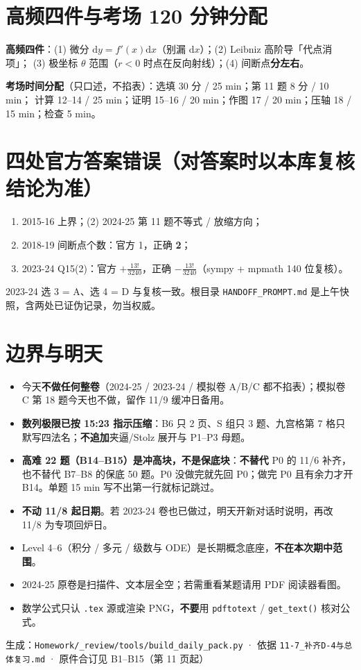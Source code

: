 \documentclass[10pt,a4paper]{ctexart}
\newcommand{\D}{\mathrm{d}}
\begin{document}
\clearpage

\section*{高频四件与考场 120 分钟分配}
\textbf{高频四件}：(1) 微分 $\D y=f'(x)\D x$（别漏 $\D x$）；(2) Leibniz 高阶导「代点消项」；
(3) 极坐标 $\theta$ 范围（$r<0$ 时点在反向射线）；(4) 间断点\textbf{分左右}。

\textbf{考场时间分配}（只口述，不掐表）：选填 30 分 / 25 min；第 11 题 8 分 / 10 min；
计算 12--14 / 25 min；证明 15--16 / 20 min；作图 17 / 20 min；压轴 18 / 15 min；检查 5 min。

\section*{四处官方答案错误（对答案时以本库复核结论为准）}
\begin{enumerate}
\item 2015-16 上界；\quad (2) 2024-25 第 11 题不等式 / 放缩方向；
\item 2018-19 间断点个数：官方 1，正确 \textbf{2}；
\item 2023-24 Q15(2)：官方 $+\frac{13!}{3240}$，正确 \textbf{$-\frac{13!}{3240}$}（sympy + mpmath 140 位复核）。
\end{enumerate}
2023-24 选 3 = A、选 4 = D 与复核一致。根目录 \texttt{HANDOFF\_PROMPT.md} 是上午快照，含两处已证伪记录，勿当权威。

\section*{边界与明天}
\begin{itemize}
\item 今天\textbf{不做任何整卷}（2024-25 / 2023-24 / 模拟卷 A/B/C 都不掐表）；模拟卷 C 第 18 题今天也不做，留作 11/9 缓冲日备用。
\item \textbf{数列极限已按 15:23 指示压缩}：B6 只 2 页、S 组只 3 题、九宫格第 7 格只默写四法名；\textbf{不追加}夹逼/Stolz 展开与 P1--P3 母题。
\item \textbf{高难 22 题（B14--B15）是冲高块，不是保底块}：\textbf{不替代} P0 的 11/6 补齐，也不替代 B7--B8 的保底 50 题。P0 没做完就先回 P0；做完 P0 且有余力才开 B14。单题 15 min 写不出第一行就标记跳过。
\item \textbf{不动 11/8 起日期}。若 2023-24 卷也已做过，明天开新对话时说明，再改 11/8 为专项回炉日。
\item Level 4--6（积分 / 多元 / 级数与 ODE）是长期概念底座，\textbf{不在本次期中范围}。
\item 2024-25 原卷是扫描件、文本层全空；若需重看某题请用 PDF 阅读器看图。
\item 数学公式只认 \texttt{.tex} 源或渲染 PNG，\textbf{不要}用 \texttt{pdftotext} / \texttt{get\_text()} 核对公式。
\end{itemize}

\vfill
\begin{center}
{\small\color{gray} 生成：\texttt{Homework/\_review/tools/build\_daily\_pack.py} ·
依据 \texttt{11-7\_补齐D-4与总体复习.md} ·
原件合订见 B1--B15（第 11 页起）}
\end{center}
\end{document}
